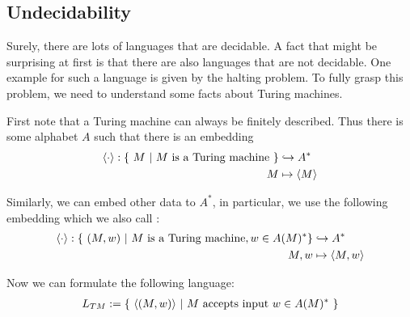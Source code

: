 \subsection{Undecidability}

Surely, there are lots of languages that are decidable.
A fact that might be surprising at first is that there are also languages that are not decidable.
One example for such a language is given by the halting problem.
To fully grasp this problem, we need to understand some facts about Turing machines.

First note that a Turing machine can always be finitely described. Thus there is some alphabet $A$ such that there is an embedding
\begin{align*}
	\langle \cdot \rangle : \{~M~|~M~\text{is a Turing machine}~\} &\hookrightarrow A^* \\
	M &\mapsto \langle M \rangle
\end{align*}

Similarly, we can embed other data to $A^*$, in particular, we use the following embedding which we also call \emb{\cdot}:
\begin{align*}
	\langle \cdot \rangle : \{ ~ (M,w) ~ | ~ M~\text{is a Turing machine}, w \in A(M)^* \} &\hookrightarrow A^* \\
	M,w &\mapsto \langle M,w \rangle
\end{align*}

Now we can formulate the following language:
\begin{align*}
	L_{TM} := \{~\langle (M,w) \rangle~|~M~\text{accepts input}~w \in A(M)^*~\}
\end{align*}

